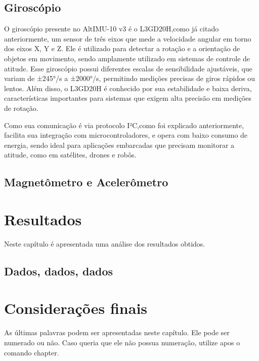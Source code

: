 \documentclass[
	12pt,				%
	openright,			%
	oneside,			%
	a4paper,			%
	english,			%
	brazil				%
	]{abntex2}
\begin{document}
\section{Giroscópio}
O giroscópio presente no AltIMU-10 v3 é o L3GD20H,como já citado anteriormente, um sensor de três eixos que mede a velocidade angular em torno dos eixos X, Y e Z. Ele é utilizado para detectar a rotação e a orientação de objetos em movimento, sendo amplamente utilizado em sistemas de controle de atitude. Esse giroscópio possui diferentes escalas de sensibilidade ajustáveis, que variam de ±245°/s a ±2000°/s, permitindo medições precisas de giros rápidos ou lentos. Além disso, o L3GD20H é conhecido por sua estabilidade e baixa deriva, características importantes para sistemas que exigem alta precisão em medições de rotação. 

Como sua comunicação é via protocolo I²C,como foi explicado anteriormente, facilita sua integração com microcontroladores, e opera com baixo consumo de energia, sendo ideal para aplicações embarcadas que precisam monitorar a atitude, como em satélites, drones e robôs.

\section{Magnetômetro e Acelerômetro}




\chapter{Resultados} \label{cap:resultados}

Neste capítulo é apresentada uma análise dos resultados obtidos.

\section{Dados, dados, dados}


\chapter{Considerações finais}
As últimas palavras podem ser apresentadas neste capítulo. Ele pode ser numerado ou não. Caso queria que ele não possua numeração, utilize \* apos o comando chapter.
\end{document}
